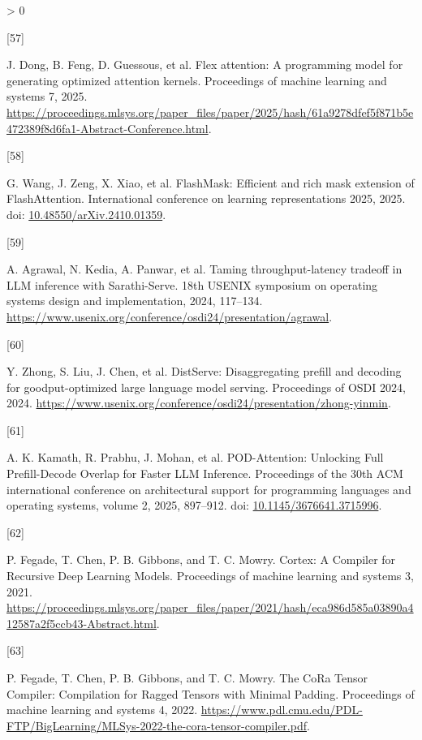 \documentclass[UTF8,10.5pt,fontset=windows]{ctexart}
\newlength{\cslhangindent}
\newlength{\csllabelwidth}
\newenvironment{CSLReferences}[2] %
 {%
  \setlength{\parindent}{0pt}
  \ifodd #1 \everypar{\setlength{\hangindent}{\cslhangindent}}\ignorespaces\fi
  \ifnum #2 > 0
  \setlength{\parskip}{#2\baselineskip}
  \fi
 }%
 {}
\newcommand{\CSLLeftMargin}[1]{\parbox[t]{\csllabelwidth}{#1}}
\newcommand{\CSLRightInline}[1]{\parbox[t]{\linewidth - \csllabelwidth}{#1}\break}
\begin{document}
\begin{CSLReferences}{0}{0}
\leavevmode{}%
\CSLLeftMargin{{[}57{]} }
\CSLRightInline{J. Dong, B. Feng, D. Guessous, et al. Flex attention: A
programming model for generating optimized attention kernels.
Proceedings of machine learning and systems 7, 2025.
\url{https://proceedings.mlsys.org/paper_files/paper/2025/hash/61a9278dfef5f871b5e472389f8d6fa1-Abstract-Conference.html}.}

\leavevmode{}%
\CSLLeftMargin{{[}58{]} }
\CSLRightInline{G. Wang, J. Zeng, X. Xiao, et al. FlashMask: Efficient
and rich mask extension of FlashAttention. International conference on
learning representations 2025, 2025. doi:
\href{https://doi.org/10.48550/arXiv.2410.01359}{10.48550/arXiv.2410.01359}.}

\leavevmode{}%
\CSLLeftMargin{{[}59{]} }
\CSLRightInline{A. Agrawal, N. Kedia, A. Panwar, et al. Taming
throughput-latency tradeoff in {LLM} inference with {Sarathi-Serve}.
18th USENIX symposium on operating systems design and implementation,
2024, 117--134.
\url{https://www.usenix.org/conference/osdi24/presentation/agrawal}.}

\leavevmode{}%
\CSLLeftMargin{{[}60{]} }
\CSLRightInline{Y. Zhong, S. Liu, J. Chen, et al. DistServe:
Disaggregating prefill and decoding for goodput-optimized large language
model serving. Proceedings of OSDI 2024, 2024.
\url{https://www.usenix.org/conference/osdi24/presentation/zhong-yinmin}.}

\leavevmode{}%
\CSLLeftMargin{{[}61{]} }
\CSLRightInline{A. K. Kamath, R. Prabhu, J. Mohan, et al.
{POD-Attention: Unlocking Full Prefill-Decode Overlap for Faster LLM
Inference}. Proceedings of the 30th ACM international conference on
architectural support for programming languages and operating systems,
volume 2, 2025, 897--912. doi:
\href{https://doi.org/10.1145/3676641.3715996}{10.1145/3676641.3715996}.}

\leavevmode{}%
\CSLLeftMargin{{[}62{]} }
\CSLRightInline{P. Fegade, T. Chen, P. B. Gibbons, and T. C. Mowry.
{Cortex: A Compiler for Recursive Deep Learning Models}. Proceedings of
machine learning and systems 3, 2021.
\url{https://proceedings.mlsys.org/paper_files/paper/2021/hash/eca986d585a03890a412587a2f5ccb43-Abstract.html}.}

\leavevmode{}%
\CSLLeftMargin{{[}63{]} }
\CSLRightInline{P. Fegade, T. Chen, P. B. Gibbons, and T. C. Mowry. {The
CoRa Tensor Compiler: Compilation for Ragged Tensors with Minimal
Padding}. Proceedings of machine learning and systems 4, 2022.
\url{https://www.pdl.cmu.edu/PDL-FTP/BigLearning/MLSys-2022-the-cora-tensor-compiler.pdf}.}


\end{CSLReferences}
\end{document}
